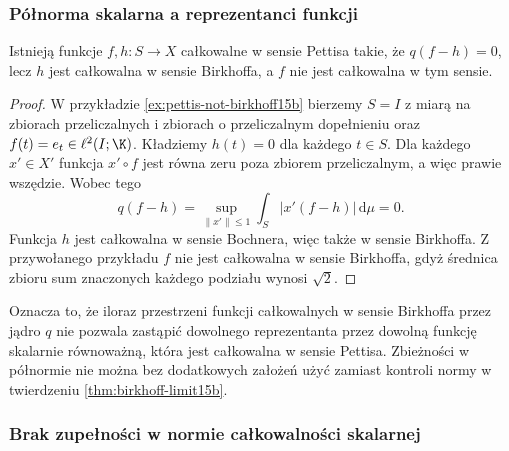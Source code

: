 \subsubsection{Półnorma skalarna a reprezentanci funkcji}

\begin{stwierdzenie}
\label{prop:birkhoff-not-q-saturated15b}
Istnieją funkcje $f,h:S\to X$ całkowalne w sensie Pettisa
takie, że $q(f-h)=0$, lecz $h$ jest całkowalna w sensie
Birkhoffa, a $f$ nie jest całkowalna w tym sensie.
\end{stwierdzenie}
\begin{proof}
W przykładzie \ref{ex:pettis-not-birkhoff15b} bierzemy
$S=I$ z miarą na zbiorach przeliczalnych i zbiorach
o przeliczalnym dopełnieniu oraz $f(t)=e_t\in\ell^2(I;\K)$.
Kładziemy $h(t)=0$ dla każdego $t\in S$.
Dla każdego $x'\in X'$ funkcja $x'\circ f$ jest równa
zeru poza zbiorem przeliczalnym, a więc prawie wszędzie.
Wobec tego
\[
 q(f-h)=\sup_{\|x'\|\le1}\int_S|x'(f-h)|\,\mathrm d\mu=0.
\]
Funkcja $h$ jest całkowalna w sensie Bochnera,
więc także w sensie Birkhoffa. Z przywołanego przykładu
$f$ nie jest całkowalna w sensie Birkhoffa, gdyż
średnica zbioru sum znaczonych każdego podziału wynosi
$\sqrt2$.
\end{proof}

Oznacza to, że iloraz przestrzeni funkcji całkowalnych
w sensie Birkhoffa przez jądro $q$ nie pozwala zastąpić
dowolnego reprezentanta przez dowolną funkcję skalarnie
równoważną, która jest całkowalna w sensie Pettisa.
Zbieżności w półnormie nie można bez dodatkowych założeń
użyć zamiast kontroli normy w twierdzeniu
\ref{thm:birkhoff-limit15b}.

\subsubsection{Brak zupełności w normie całkowalności skalarnej}

